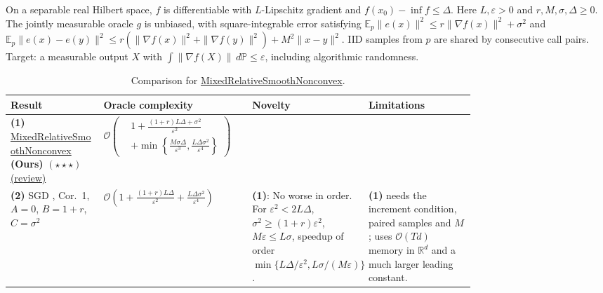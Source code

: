 \begin{table}[tp]
\centering
\caption{Comparison for \href{https://github.com/k3nfalt/longtails/blob/main/LongTails/Setups/MixedRelativeSmoothNonconvex.lean}{MixedRelativeSmoothNonconvex}.}\label{tab:MixedRelativeSmoothNonconvex}
\parbox{\linewidth}{\footnotesize On a separable real Hilbert space, $f$ is differentiable with $L$-Lipschitz gradient and $f(x_0)-\inf f\le\Delta$. Here $L,\varepsilon>0$ and $r,M,\sigma,\Delta\ge0$. The jointly measurable oracle $g$ is unbiased, with square-integrable error satisfying $\mathbb E_p\|e(x)\|^2\le r\|\nabla f(x)\|^2+\sigma^2$ and $\mathbb E_p\|e(x)-e(y)\|^2\le r(\|\nabla f(x)\|^2+\|\nabla f(y)\|^2)+M^2\|x-y\|^2$. IID samples from $p$ are shared by consecutive call pairs. Target: a measurable output $X$ with $\int\|\nabla f(X)\|\,d\mathbb P\le\varepsilon$, including algorithmic randomness.}\par\smallskip
\begin{threeparttable}
\footnotesize
\setlength{\tabcolsep}{4pt}\renewcommand{\arraystretch}{1.25}
\begin{tabularx}{\linewidth}{@{}>{\raggedright\arraybackslash}p{0.20\linewidth}>{\raggedright\arraybackslash}p{0.32\linewidth}>{\raggedright\arraybackslash}p{0.25\linewidth}>{\raggedright\arraybackslash}X@{}}
\toprule
\textbf{Result} & \textbf{Oracle complexity} & \textbf{Novelty} & \textbf{Limitations} \\
\midrule
\textbf{(1)} \href{https://github.com/k3nfalt/longtails/blob/main/LongTails/Theorems/MixedRelativeSmoothNonconvex.lean}{Mixed\allowbreak Relative\allowbreak Smooth\allowbreak Nonconvex} \textbf{(Ours)} $(\star\star\star)$ \href{https://github.com/k3nfalt/longtails/blob/main/scripts/reviews/MixedRelativeSmoothNonconvex.md}{(review)}
& $\mathcal{O}\!\left(\begin{aligned} &1+\frac{(1+r)L\Delta+\sigma^2}{\varepsilon^2}\\[-2pt]&+\min\!\left\{\frac{M\sigma\Delta}{\varepsilon^3},\frac{L\Delta\sigma^2}{\varepsilon^4}\right\}\end{aligned}\right)$ & & \\
\midrule[1.2pt]
\textbf{(2)} SGD \citep{mrsnKhaled2020v3}, Cor.~1, $A=0$, $B=1+r$, $C=\sigma^2$
& $\mathcal{O}\!\left(1+\frac{(1+r)L\Delta}{\varepsilon^2}+\frac{L\Delta\sigma^2}{\varepsilon^4}\right)$
& \textbf{(1)}: No worse in order. For $\varepsilon^2<2L\Delta$, $\sigma^2\ge(1+r)\varepsilon^2$, $M\varepsilon\le L\sigma$, speedup of order $\min\{L\Delta/\varepsilon^2,L\sigma/(M\varepsilon)\}$.
& \textbf{(1)} needs the increment condition, paired samples and $M$; uses $\mathcal{O}(Td)$ memory in $\mathbb R^d$ and a much larger leading constant. \\

\end{tabularx}
\end{threeparttable}
\end{table}

